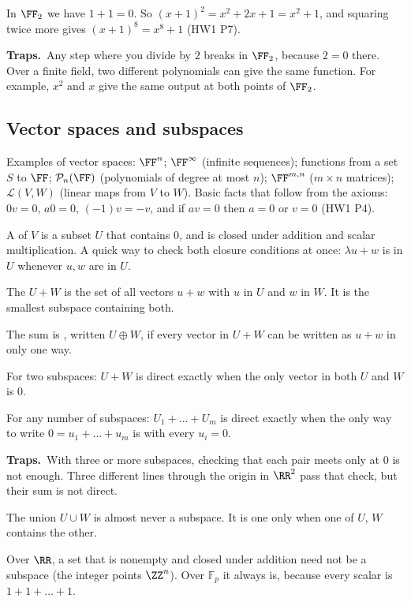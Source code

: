 \documentclass[11pt]{scrartcl}
\newcommand{\LL}{\mathcal L}
\newcommand{\PP}{\mathcal P}
\newcommand{\Fp}{\mathbb F_p}
\newcommand{\traps}{\par\medskip\noindent\textbf{\color{RawSienna}Traps.}\ }
\begin{document}
In $\FF_2$ we have $1+1=0$. So $(x+1)^2=x^2+2x+1=x^2+1$, and squaring twice more gives $(x+1)^8=x^8+1$ (HW1 P7).

\traps Any step where you divide by $2$ breaks in $\FF_2$, because $2=0$ there.
Over a finite field, two different polynomials can give the same function. For example, $x^2$ and $x$ give the same output at both points of $\FF_2$.

\subsection{Vector spaces and subspaces}
Examples of vector spaces: $\FF^n$; $\FF^\infty$ (infinite sequences); functions from a set $S$ to $\FF$; $\PP_n(\FF)$ (polynomials of degree at most $n$); $\FF^{m,n}$ ($m\times n$ matrices); $\LL(V,W)$ (linear maps from $V$ to $W$).
Basic facts that follow from the axioms: $0v=0$, $a0=0$, $(-1)v=-v$, and if $av=0$ then $a=0$ or $v=0$ (HW1 P4).

\begin{definition*}
  A  of $V$ is a subset $U$ that contains $0$, and is closed under addition and scalar multiplication.
  A quick way to check both closure conditions at once: $\lambda u+w$ is in $U$ whenever $u,w$ are in $U$.

  The  $U+W$ is the set of all vectors $u+w$ with $u$ in $U$ and $w$ in $W$. It is the smallest subspace containing both.

  The sum is , written $U\oplus W$, if every vector in $U+W$ can be written as $u+w$ in only one way.
\end{definition*}

\begin{proposition*}[LADR 1.45]
  For two subspaces: $U+W$ is direct exactly when the only vector in both $U$ and $W$ is $0$.

  For any number of subspaces: $U_1+\dots+U_m$ is direct exactly when the only way to write $0=u_1+\dots+u_m$ is with every $u_i=0$.
\end{proposition*}

\traps With three or more subspaces, checking that each pair meets only at $0$ is not enough. Three different lines through the origin in $\RR^2$ pass that check, but their sum is not direct.

The union $U\cup W$ is almost never a subspace. It is one only when one of $U$, $W$ contains the other.

Over $\RR$, a set that is nonempty and closed under addition need not be a subspace (the integer points $\ZZ^n$). Over $\Fp$ it always is, because every scalar is $1+1+\dots+1$.
\end{document}
